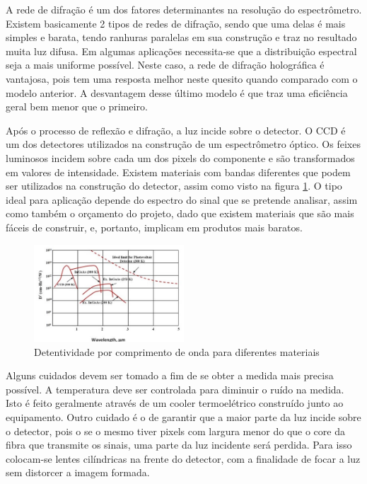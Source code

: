 \documentclass[article]{IEEEtran}
\begin{document}
A rede de difração é um dos fatores determinantes na resolução do espectrômetro. Existem basicamente 2 tipos de redes de difração, sendo que uma delas é mais simples e barata, tendo ranhuras paralelas em sua construção e traz no resultado muita luz difusa. Em algumas aplicações necessita-se que a distribuição espectral seja a mais uniforme possível. Neste caso, a rede de difração holográfica é vantajosa, pois tem uma resposta melhor neste quesito quando comparado com o modelo anterior. A desvantagem desse último modelo é que traz uma eficiência geral bem menor que o primeiro.

Após o processo de reflexão e difração, a luz incide sobre o detector. O CCD é um dos detectores utilizados na construção de um espectrômetro óptico. Os feixes luminosos incidem sobre cada um dos pixels do componente e são transformados em valores de intensidade. Existem materiais com bandas diferentes que podem ser utilizados na construção do detector, assim como visto na figura \ref{fig:materiais_detector}. O tipo ideal para aplicação depende do espectro do sinal que se pretende analisar, assim como também o orçamento do projeto, dado que existem materiais que são mais fáceis de construir, e, portanto, implicam em produtos mais baratos.

\begin{figure}[H]
	\includegraphics[width=0.5\textwidth]{images/banda_ccd.jpg}
	\caption{Detentividade por comprimento de onda para diferentes materiais}
	\label{fig:materiais_detector}
\end{figure} 

Alguns cuidados devem ser tomado a fim de se obter a medida mais precisa possível. A temperatura deve ser controlada para diminuir o ruído na medida. Isto é feito geralmente através de um cooler termoelétrico construído junto ao equipamento. Outro cuidado é o de garantir que a maior parte da luz incide sobre o detector, pois o se o mesmo tiver pixels com largura menor do que o core da fibra que transmite os sinais, uma parte da luz incidente será perdida. Para isso colocam-se lentes cilíndricas na frente do detector, com a finalidade de focar a luz sem distorcer a imagem formada.
\end{document}
